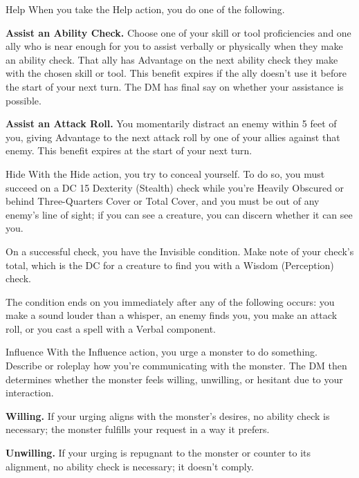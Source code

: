 \begin{Card}[Action]{Help}
When you take the Help action, you do one of the following.

\textbf{Assist an Ability Check.} Choose one of your skill or tool proficiencies and one ally who is near enough for you to assist verbally or physically when they make an ability check. That ally has Advantage on the next ability check they make with the chosen skill or tool. This benefit expires if the ally doesn't use it before the start of your next turn. The DM has final say on whether your assistance is possible.

\textbf{Assist an Attack Roll.} You momentarily distract an enemy within 5 feet of you, giving Advantage to the next attack roll by one of your allies against that enemy. This benefit expires at the start of your next turn.
\end{Card}


\begin{Card}[Action]{Hide}
With the Hide action, you try to conceal yourself. To do so, you must succeed on a DC 15 Dexterity (Stealth) check while you're Heavily Obscured or behind Three-Quarters Cover or Total Cover, and you must be out of any enemy's line of sight; if you can see a creature, you can discern whether it can see you.

On a successful check, you have the Invisible condition. Make note of your check's total, which is the DC for a creature to find you with a Wisdom (Perception) check.

The condition ends on you immediately after any of the following occurs: you make a sound louder than a whisper, an enemy finds you, you make an attack roll, or you cast a spell with a Verbal component.
\end{Card}


\begin{Card}[1 of 2, Action]{Influence}
With the Influence action, you urge a monster to do something. Describe or roleplay how you're communicating with the monster. The DM then determines whether the monster feels willing, unwilling, or hesitant due to your interaction.

\textbf{Willing.} If your urging aligns with the monster's desires, no ability check is necessary; the monster fulfills your request in a way it prefers.

\textbf{Unwilling.} If your urging is repugnant to the monster or counter to its alignment, no ability check is necessary; it doesn't comply.
\end{Card}

